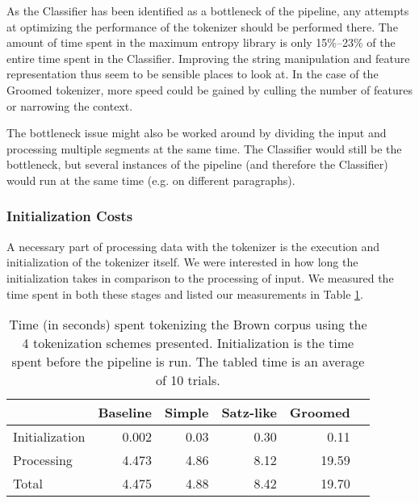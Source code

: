 As the Classifier has been identified as a bottleneck of the pipeline, any
attempts at optimizing the performance of the tokenizer should be performed
there. The amount of time spent in the maximum entropy library is only
15\%--23\% of the entire time spent in the Classifier. Improving the string
manipulation and feature representation thus seem to be sensible places to look
at. In the case of the Groomed tokenizer, more speed could be gained by culling
the number of features or narrowing the context.

The bottleneck issue might also be worked around by dividing the input and
processing multiple segments at the same time. The Classifier would still be
the bottleneck, but several instances of the pipeline (and therefore the
Classifier) would run at the same time (e.g. on different paragraphs).

\subsubsection{Initialization Costs}
\label{ssec:eval-spd-init}

A necessary part of processing data with the tokenizer is the execution and
initialization of the tokenizer itself. We were interested in how long the
initialization takes in comparison to the processing of input. We measured the
time spent in both these stages and listed our measurements in Table
\ref{tbl:timeline}.

\begin{table}
  \begin{center}
    \begin{tabular}{ | l | r | r | r | r | r | }
      \hline
      & Baseline & Simple & Satz-like & Groomed \\ \hline
      Initialization & 0.002 & 0.03 & 0.30 & 0.11 \\ \hline
      Processing & 4.473 & 4.86 & 8.12 & 19.59 \\ \hline
      Total & 4.475 & 4.88 & 8.42 & 19.70 \\
      \hline
    \end{tabular}
  \end{center}
  \caption[Time spent in individual initialization steps]
    {Time (in seconds) spent tokenizing the Brown corpus using the 4
    tokenization schemes presented. Initialization is the time spent before the
    pipeline is run. The tabled time is an average of 10 trials.}
  \label{tbl:timeline}
\end{table}

